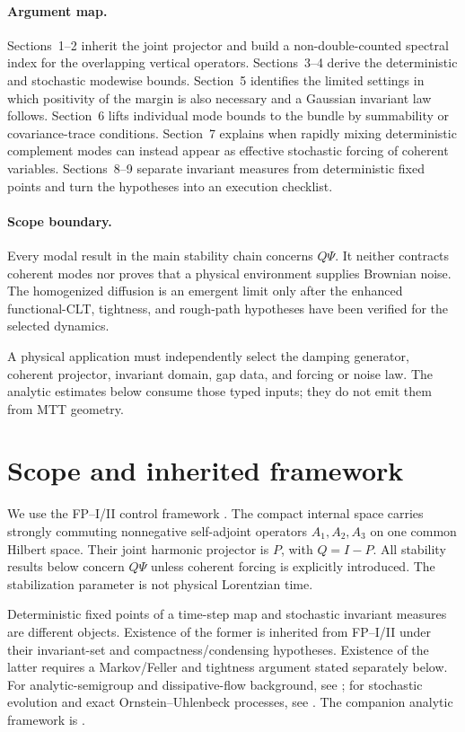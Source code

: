 \documentclass[11pt]{article}
\begin{document}
\paragraph{Argument map.}
Sections~1--2 inherit the joint projector and build a non-double-counted
spectral index for the overlapping vertical operators.  Sections~3--4 derive
the deterministic and stochastic modewise bounds.  Section~5 identifies the
limited settings in which positivity of the margin is also necessary and a
Gaussian invariant law follows.  Section~6 lifts individual mode bounds to
the bundle by summability or covariance-trace conditions.  Section~7 explains
when rapidly mixing deterministic complement modes can instead appear as
effective stochastic forcing of coherent variables.  Sections~8--9 separate
invariant measures from deterministic fixed points and turn the hypotheses
into an execution checklist.

\paragraph{Scope boundary.}
Every modal result in the main stability chain concerns $Q\Psi$.  It neither
contracts coherent modes nor proves that a physical environment supplies
Brownian noise.  The homogenized diffusion is an emergent limit only after
the enhanced functional-CLT, tightness, and rough-path hypotheses have been
verified for the selected dynamics.

A physical application must independently select the damping generator,
coherent projector, invariant domain, gap data, and forcing or noise law.  The
analytic estimates below consume those typed inputs; they do not emit them
from MTT geometry.

\tableofcontents

\section{Scope and inherited framework}

We use the FP--I/II control framework \cite{Nero2025FP1,FP2}. The compact internal space
carries strongly commuting nonnegative self-adjoint operators $A_1,A_2,A_3$
on one common Hilbert space. Their joint harmonic projector is $P$, with
$Q=I-P$. All stability results below concern $Q\Psi$ unless coherent forcing
is explicitly introduced. The stabilization parameter is not physical
Lorentzian time.

Deterministic fixed points of a time-step map and stochastic invariant measures
are different objects. Existence of the former is inherited from FP--I/II under
their invariant-set and compactness/condensing hypotheses. Existence of the
latter requires a Markov/Feller and tightness argument stated separately below.
For analytic-semigroup and dissipative-flow background, see
\cite{Amann1995,Henry1981,Temam1997}; for stochastic evolution and exact
Ornstein--Uhlenbeck processes, see
\cite{DaPratoZabczyk1992,Gardiner2009}. The companion analytic framework is
\cite{Nero2025FP1}.
\end{document}
